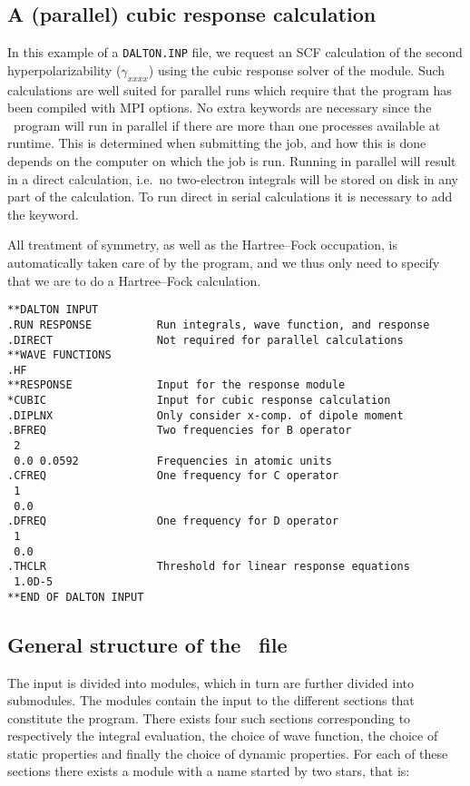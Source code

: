 \subsection{A (parallel) cubic response calculation}

In this example of a \verb|DALTON.INP| file, we request an SCF
calculation of the second
hyperpolarizability
($\gamma_{xxxx}$) using
the cubic response solver
of the {\resp} module. Such calculations are well suited for parallel runs
which require that the program has been compiled with MPI options. No extra
keywords are necessary since the \dalton\ program will run in parallel if there are more than one processes available at runtime. This is determined when
submitting the job, and how this is done depends on the computer on which the
job is run. Running in parallel will result in a direct calculation, i.e.\
no two-electron integrals will be stored on disk in any part of the
calculation. To run direct in serial calculations it is necessary to add the  keyword.

All treatment  of symmetry, as well as the Hartree--Fock
occupation, is
automatically taken care of by the program, and we thus only need to
specify that we are to do a Hartree--Fock calculation.

\begin{verbatim}
**DALTON INPUT
.RUN RESPONSE          Run integrals, wave function, and response
.DIRECT                Not required for parallel calculations
**WAVE FUNCTIONS
.HF
**RESPONSE             Input for the response module
*CUBIC                 Input for cubic response calculation
.DIPLNX                Only consider x-comp. of dipole moment
.BFREQ                 Two frequencies for B operator
 2
 0.0 0.0592            Frequencies in atomic units
.CFREQ                 One frequency for C operator
 1
 0.0
.DFREQ                 One frequency for D operator
 1
 0.0
.THCLR                 Threshold for linear response equations
 1.0D-5
**END OF DALTON INPUT
\end{verbatim}


\subsection{General structure of the \dalinp\ file}\label{sec:inputstructure}

The input is divided into modules, which in turn are
further divided into submodules\index{submodule}. The modules contain
the input to the different
sections that constitute the {\dalton} program. There exists
four such sections corresponding to respectively the integral
evaluation, the choice of wave function, the
choice of static properties\index{molecular properties} and finally
the choice of dynamic properties\index{response}. For each of
these sections there exists a module with a name started by two stars,
that is:

